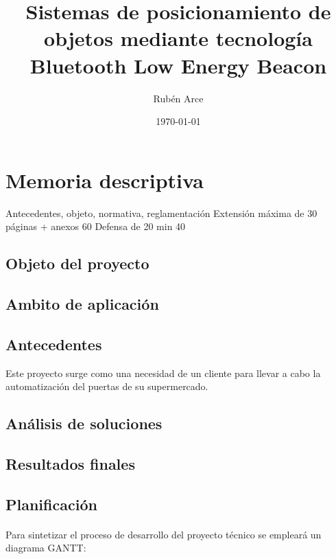 \documentclass[a4paper ,12pt, onecolumn]{article}
\begin{document}
\title{Sistemas de posicionamiento de objetos mediante tecnología Bluetooth Low Energy
Beacon }
\author{Rubén Arce}
\date{\today}
\maketitle
\tableofcontents
\cleardoublepage
\section{Memoria descriptiva}
Antecedentes, objeto, normativa, reglamentación
Extensión máxima de 30 páginas + anexos 60
Defensa de 20 min  40
    \subsection{Objeto del proyecto}
    \subsection{Ambito de aplicación}
    \subsection{Antecedentes}
    Este proyecto surge como una necesidad de un cliente para llevar a cabo la automatización del puertas
    de su supermercado. 
    \subsection{Análisis de soluciones}
    \subsection{Resultados finales}
    \subsection{Planificación}
        \paragraph{}
        Para sintetizar el proceso de desarrollo del proyecto técnico se empleará un diagrama GANTT: 
\end{document}

